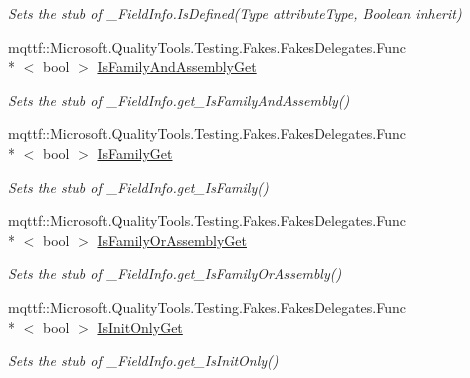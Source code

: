 \begin{DoxyCompactItemize}
\begin{DoxyCompactList}\small\item\em Sets the stub of \-\_\-\-Field\-Info.\-Is\-Defined(\-Type attribute\-Type, Boolean inherit)\end{DoxyCompactList}\item 
mqttf\-::\-Microsoft.\-Quality\-Tools.\-Testing.\-Fakes.\-Fakes\-Delegates.\-Func\\*
$<$ bool $>$ \hyperlink{class_system_1_1_runtime_1_1_interop_services_1_1_fakes_1_1_stub___field_info_a5944538870f557d388c0bb791b5a5397}{Is\-Family\-And\-Assembly\-Get}
\begin{DoxyCompactList}\small\item\em Sets the stub of \-\_\-\-Field\-Info.\-get\-\_\-\-Is\-Family\-And\-Assembly()\end{DoxyCompactList}\item 
mqttf\-::\-Microsoft.\-Quality\-Tools.\-Testing.\-Fakes.\-Fakes\-Delegates.\-Func\\*
$<$ bool $>$ \hyperlink{class_system_1_1_runtime_1_1_interop_services_1_1_fakes_1_1_stub___field_info_abefc1e8812519c8b3b841d6eec2994b3}{Is\-Family\-Get}
\begin{DoxyCompactList}\small\item\em Sets the stub of \-\_\-\-Field\-Info.\-get\-\_\-\-Is\-Family()\end{DoxyCompactList}\item 
mqttf\-::\-Microsoft.\-Quality\-Tools.\-Testing.\-Fakes.\-Fakes\-Delegates.\-Func\\*
$<$ bool $>$ \hyperlink{class_system_1_1_runtime_1_1_interop_services_1_1_fakes_1_1_stub___field_info_a86fb3e79c51159f38ae453a5091e419a}{Is\-Family\-Or\-Assembly\-Get}
\begin{DoxyCompactList}\small\item\em Sets the stub of \-\_\-\-Field\-Info.\-get\-\_\-\-Is\-Family\-Or\-Assembly()\end{DoxyCompactList}\item 
mqttf\-::\-Microsoft.\-Quality\-Tools.\-Testing.\-Fakes.\-Fakes\-Delegates.\-Func\\*
$<$ bool $>$ \hyperlink{class_system_1_1_runtime_1_1_interop_services_1_1_fakes_1_1_stub___field_info_a55b5aa727ce4a220898669830ddb4fba}{Is\-Init\-Only\-Get}
\begin{DoxyCompactList}\small\item\em Sets the stub of \-\_\-\-Field\-Info.\-get\-\_\-\-Is\-Init\-Only()\end{DoxyCompactList}\item 

\end{DoxyCompactItemize}
